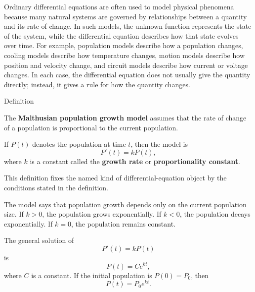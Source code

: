 \begin{exposition}
Ordinary differential equations are often used to model physical phenomena because many natural systems are governed by relationships between a quantity and its rate of change. In such models, the unknown function represents the state of the system, while the differential equation describes how that state evolves over time. For example, population models describe how a population changes, cooling models describe how temperature changes, motion models describe how position and velocity change, and circuit models describe how current or voltage changes. In each case, the differential equation does not usually give the quantity directly; instead, it gives a rule for how the quantity changes.
\end{exposition}


\begin{definitionbox}{Definition}
\begin{definition}
\label{def:ordinary-differential-equations-models-malthusian-population-growth-model}
The \textbf{Malthusian population growth model} assumes that the rate of change of a population is proportional to the current population.

If $P(t)$ denotes the population at time $t$, then the model is
\[
P'(t)=kP(t),
\]
where $k$ is a constant called the \textbf{growth rate} or \textbf{proportionality constant}.
\end{definition}
\end{definitionbox}

\begin{remark*}
This definition fixes the named kind of differential-equation object by the
conditions stated in the definition.
\end{remark*}

\NoLocalDependencies

\begin{remark*}[Interpretation]
The model says that population growth depends only on the current population size. If $k>0$, the population grows exponentially. If $k<0$, the population decays exponentially. If $k=0$, the population remains constant.
\end{remark*}

\begin{example*}
The general solution of
\[
P'(t)=kP(t)
\]
is
\[
P(t)=Ce^{kt},
\]
where $C$ is a constant. If the initial population is $P(0)=P_0$, then
\[
P(t)=P_0e^{kt}.
\]
\end{example*}







